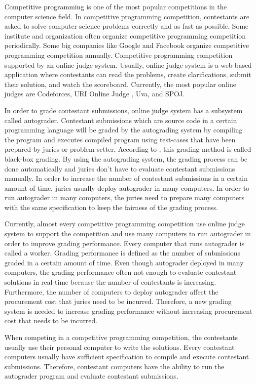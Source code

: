 \documentclass[conference]{IEEEtran}
\begin{document}
Competitive programming is one of the most popular competitions in the computer science field. In competitive programming competition, contestants are asked to solve computer science problems correctly and as fast as possible. Some institute and organization often organize competitive programming competition periodically. Some big companies like Google and Facebook organize competitive programming competition annually. Competitive programming competition supported by an online judge system. Usually, online judge system is a web-based application where contestants can read the problems, create clarifications, submit their solution, and watch the scoreboard. Currently, the most popular online judges are Codeforces, URI Online Judge \cite{uriojpaper}, Uva, and SPOJ.

In order to grade contestant submissions, online judge system has a subsystem called autograder. Contestant submissions which are source code in a certain programming language will be graded by the autograding system by compiling the program and executes compiled program using test-cases that have been prepared by juries or problem setter. According to \cite{jordanioi}, this grading method is called black-box grading. By using the autograding system, the grading process can be done automatically and juries don't have to evaluate contestant submissions manually. In order to increase the number of contestant submissions in a certain amount of time, juries usually deploy autograder in many computers. In order to run autograder in many computers, the juries need to prepare many computers with the same specification to keep the fairness of the grading process.

Currently, almost every competitive programming competition use online judge system to support the competition and use many computers to run autograder in order to improve grading performance. Every computer that runs autograder is called a worker. Grading performance is defined as the number of submissions graded in a certain amount of time. Even though autograder deployed in many computers, the grading performance often not enough to evaluate contestant solutions in real-time because the number of contestants is increasing. Furthermore, the number of computers to deploy autograder affect the procurement cost that juries need to be incurred. Therefore, a new grading system is needed to increase grading performance without increasing procurement cost that needs to be incurred.

When competing in a competitive programming competition, the contestants usually use their personal computer to write the solutions. Every contestant computers usually have sufficient specification to compile and execute contestant submissions. Therefore, contestant computers have the ability to run the autograder program and evaluate contestant submissions.
\end{document}
